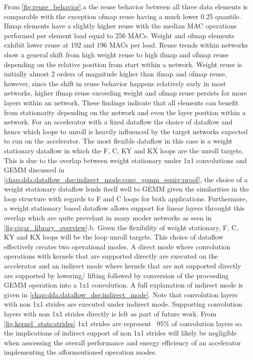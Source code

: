 From \autoref{fig:reuse_behavior}.a the reuse behavior between all three data
elements is comparable with the exception ofmap reuse having a much lower 0.25
quantile. Ifmap elements have a slightly higher reuse with the median MAC
operations performed per element load equal to 256 MACs. Weight and ofmap
elements exhibit lower reuse at 192 and 196 MACs per load. Reuse trends within
networks show a general shift from high weight reuse to high ifmap and ofmap
reuse depending on the relative position from start within a network. Weight
reuse is initially almost 2 orders of magnitude higher than ifmap and ofmap
reuse, however, since the shift in reuse behavior happens relatively early in
most networks, higher ifmap reuse exceeding weight and ofmap reuse persists for
more layers within an network. These findings indicate that all elements can
benefit from stationarity depending on the network and even the layer position
within a network. For an accelerator with a fixed dataflow the choice of
dataflow and hence which loops to unroll is heavily influenced by the target
networks expected to run on the accelerator. The most flexible dataflow in this
case is a weight stationary dataflow in which the F, C, KY and KX loops are the
unroll targets. This is due to the overlap between weight stationary under 1x1
convolutions and GEMM discussed in
\autoref{chap:dda:dataflow_dse:indirect_mode:conv_gemm_equiv:proof}, the choice
of a weight stationary dataflow lends itself well to \ac{GEMM} given the
similarities in the loop structure with regards to F and C loops for both
applications. Furthermore, a weight stationary based dataflow allows support for
linear layers throught this overlap which are quite prevelant in many moder
networks as seen in \autoref{fig:cigar_library_overview}.b. Given the
flexibility of weight stationary, F, C, KY and KX loops will be the loop unroll
targets. This choice of dataflow effectively creates two operational modes. A
direct mode where convolution operations with kernels that are supported
directly are executed on the accelerator and an indirect mode where kernels that
are not supported directly are supported by lowering/ lifting followed by
conversion of the proceeding GEMM operation into a 1x1 convolution. A full
explanation of indirect mode is given in
\autoref{chap:dda:dataflow_dse:indirect_mode}. Note that convolution layers with
non 1x1 strides are executed under indirect mode. Supporting convolution layers
with non 1x1 strides directly is left as part of future work. From
\autoref{fig:kernel_stats:strides} 1x1 strides are represent ~95\% of
convolution layers so the implications of indirect support of non 1x1 strides
will likely be negligible when asscessing the overall performance and energy
efficiency of an accelerator implementing the afformentioned operation modes.

